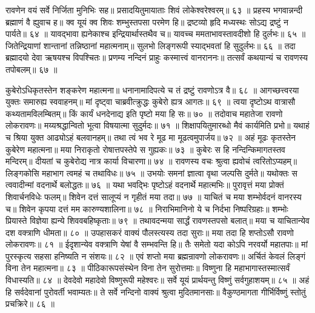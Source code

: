 रावणेन वयं सर्वे निर्जिता मुनिभिः सह॥
प्रसादयितुमायाताः शिवं लोकेश्वरेश्वरम्॥ ६३ ॥
प्रहस्य भगवान्नन्दी ब्रह्माणं वै ह्युवाच ह॥
क्व यूयं क्व शिवः शम्भुस्तपसा परमेण हि॥
द्रष्टव्यो हृदि मध्यस्थः सोऽद्य द्रष्टुं न पार्यते॥ ६४ ॥
यावद्भावा ह्यनेकाश्च इन्द्रियार्थास्तथैव च॥
यावच्च ममताभावस्तावदीशो हि दुर्लभः॥ ६५ ॥
जितेन्द्रियाणां शान्तानां तन्निष्ठानां महात्मनाम्॥
सुलभो लिङ्गरूपी स्याद्भवतां हि सुदुर्लभः॥ ६६ ॥
तदा ब्रह्मादयो देवा ऋषयश्च विपश्चितः॥
प्रणम्य नन्दिनं प्राहुः कस्मात्त्वं वानराननः॥
तत्सर्वं कथयान्यं च रावणस्य तपोबलम्॥ ६७ ॥

कुबेरोऽधिकृतस्तेन शङ्करेण महात्मना॥
धनानामादिपत्ये च तं द्रष्टुं रावणोऽत्र वै॥ ६८ ॥
आगच्छत्त्वरया युक्तः समारुह्य स्ववाहनम्॥
मां दृष्ट्वा चाब्रवीत्क्रुद्धः कुबेरो ह्यत्र आगतः॥ ६९ ॥
त्वया दृष्टोऽथ वात्रासौ कथ्यतामविलम्बितम्॥
किं कार्यं धनदेनाद्य इति पृष्टो मया हि सः॥ ७० ॥
तदोवाच महातेजा रावणो लोकरावणः॥
मय्यश्रद्धान्वितो भूत्वा विषयात्मा सुदुर्मदः॥ ७१ ॥
शिक्षापयितुमारब्धो मैवं कार्यमिति प्रभो॥
यथाहं च श्रिया युक्त आढ्योऽहं बलवानहम्॥
तथा त्वं भव रे मूढ मा मूढत्वमुपार्जय॥ ७२ ॥
अहं मूढः कृतस्तेन कुबेरेण महात्मना॥
मया निराकृतो रोषात्तपस्तेपे स गुह्यकः॥ ७३ ॥
कुबेरः स हि नन्दिन्किमागतस्तव मन्दिरम्॥
दीयतां च कुबेरोद्य नात्र कार्या विचारणा॥ ७४ ॥
रावणस्य वचः श्रुत्वा ह्यवोचं त्वरितोऽप्यहम्॥
लिङ्गकोसि महाभाग त्वमहं च तथाविधः॥ ७५ ॥
उभयोः समनां ज्ञात्वा वृथा जल्पसि दुर्मते॥
यथोक्तः स त्ववादीन्मां वदनार्थे बलोद्धतः॥ ७६ ॥
यथा भवद्भिः पृष्टोऽहं वदनार्थे महात्मभिः॥
पुरावृत्तं मया प्रोक्तं शिवार्चनविधेः फलम्॥
शिवेन दत्तं सालूप्यं न गृहीतं मया तदा॥ ७७ ॥
याचितं च मया शम्भोर्वदनं वानरस्य च॥
शिवेन कृपया दत्तं मम कारुण्यशालिना॥ ७८ ॥
निराभिमानिनो ये च निर्दभा निष्परिग्रहाः॥
शम्भोः प्रियास्ते विज्ञेया ह्यन्ये शिववबहिष्कृताः॥ ७९ ॥
तथावदन्मया सार्द्धं रावणस्तपसो बलात्॥
मया च याचितान्येव दश वक्त्राणि धीमता॥ ८० ॥
उपहासकरं वाक्यं पौलस्त्यस्य तदा सुराः॥
मया तदा हि शप्तोऽसौ रावणो लोकरावणः॥ ८१ ॥
ईदृशान्येव वक्त्राणि येषां वै सम्भवन्ति हि॥
तैः समेतो यदा कोऽपि नरवर्यो महातपाः॥
मां पुरस्कृत्य सहसा हनिष्यति न संशयः॥ ८२ ॥
एवं शप्तो मया ब्रह्मन्रावणो लोकरावणः॥
अर्चितं केवलं लिङ्गं विना तेन महात्मना॥ ८३ ॥
पीठिकारूपसंस्थेन विना तेन सुरोत्तमाः॥
विष्णुना हि महाभागास्तस्मात्सर्वं विधास्यति॥ ८४ ॥
देवदेवो महादेवो विष्णुरूपी महेश्वरः॥
सर्वे यूयं प्रार्थयन्तु विष्णुं सर्वगुहाशयम्॥ ८५ ॥
अहं हि सर्वदेवानां पुरोवर्ती भवाम्यतः॥
ते सर्वे नन्दिनो वाक्यं श्रुत्वा मुदितमानसाः॥
वैकुण्ठमागता गीर्भिर्विष्णुं स्तोतुं प्रचक्रिरे॥ ८६ ॥

